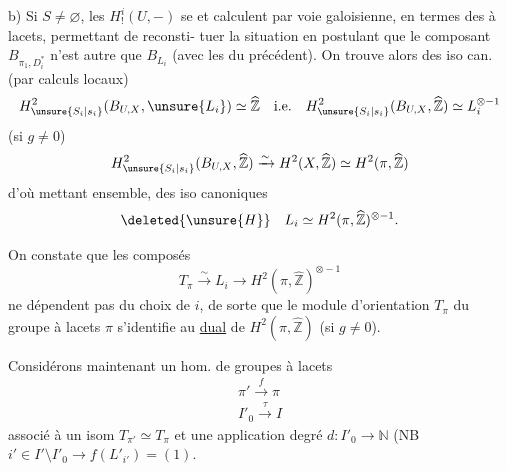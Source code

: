 b) Si $S\ne\varnothing$, les $H^i_!(U,-)$ se 
et calculent par voie galoisienne, en termes
des   à lacets, permettant de reconsti-
tuer la situation
en postulant que le composant $B_{\pi_1,D_i^{*}}$
n'est autre que $B_{L_i}$ (avec les
 du  précédent). On
trouve alors des iso can. (par calculs locaux)
\[
H^2_{\unsure{S_i|s_i}}(B_{U,X},\unsure{L_i})\simeq\widehat{\mathbb Z}
\quad\text{i.e.}\quad
H^2_{\unsure{S_i|s_i}}(B_{U,X},\widehat{\mathbb Z})\simeq L_i^{\otimes-1}
\]
(si $g\ne0$)
\[
H^2_{\unsure{S_i|s_i}}(B_{U,X},\widehat{\mathbb Z})
\xrightarrow{\sim}H^2(X,\widehat{\mathbb Z})
\simeq H^2(\pi,\widehat{\mathbb Z})
\]
d'où   mettant ensemble, des iso
canoniques
\[
\deleted{\unsure{H}}\quad L_i\simeq H^2(\pi,\widehat{\mathbb Z})^{\otimes-1}.
\]

On constate que les composés
\[
T_\pi \xrightarrow{\sim} L_i \longrightarrow
H^2(\pi,\widehat{\mathbb Z})^{\otimes-1}
\]
ne dépendent pas du choix de $i$, de sorte que le module d'orientation $T_\pi$ du groupe  à lacets $\pi$ s'identifie au \uline{dual} de $H^2(\pi,\widehat{\mathbb Z})$ (si $g\ne0$).

Considérons maintenant un hom. de groupes à lacets
\[
\begin{gathered}
\pi'\xrightarrow{f}\pi\\
I'_0\xrightarrow{\tau}I
\end{gathered}
\]
associé à un isom $T_{\pi'}\simeq T_\pi$ et une application degré
$d:I'_0\longrightarrow\mathbb N$
(NB $i'\in I'\setminus I'_0\longrightarrow f(L'_{i'})=(1)$.

